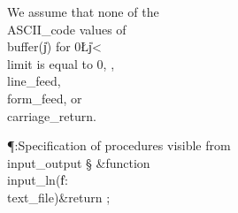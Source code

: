 We assume that none of the \\{ASCII\_code} values
of \\{buffer}\?(\?\|j\?)\? for 0\?\L\?\|j\?<\?\\{limit} is equal to 0, %
, \\{line\_feed},
\\{form\_feed}, or \\{carriage\_return}.

\Y\P\?\4:Specification of procedures visible from \\{input\_output}\X%
\mathrel{+}\S\?\6
\&{function}\8\1\\{input\_ln}\?(\1\?\|f\?:\?\\{text\_file}\?\2)\&{return}\?\8%
\2;\par
\fi

